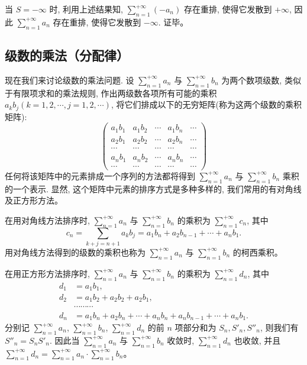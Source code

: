 \documentclass[UTF8,12pt,a4paper,fontset=fandol]{ctexart}
\begin{document}
当 $S=-\infty$ 时, 利用上述结果知, $\sum\limits_{n=1}^{+\infty}(-a_n)$ 存在重排, 使得它发散到 $+\infty$, 因此 $\sum\limits_{n=1}^{+\infty}a_n$ 存在重排, 使得它发散到 $-\infty$. 证毕。

\subsection{级数的乘法（分配律）}

现在我们来讨论级数的乘法问题. 设 $\sum\limits_{n=1}^{+\infty}a_n$ 与 $\sum\limits_{n=1}^{+\infty}b_n$ 为两个数项级数, 类似于有限项求和的乘法规则, 作出两级数各项所有可能的乘积 $a_kb_j(k=1,2,\cdots,j=1,2,\cdots)$, 将它们排成以下的无穷矩阵(称为这两个级数的乘积矩阵):
\[
  \begin{pmatrix}
    a_1b_1 & a_1b_2 & \cdots & a_1b_n & \cdots\\
    a_2b_1 & a_2b_2 & \cdots & a_2b_n & \cdots\\
    \cdots & \cdots & \cdots & \cdots & \cdots\\
    a_nb_1 & a_nb_2 & \cdots & a_nb_n & \cdots\\
    \cdots & \cdots & \cdots & \cdots & \cdots
  \end{pmatrix}
\]
任何将该矩阵中的元素排成一个序列的方法都将得到 $\sum\limits_{n=1}^{+\infty}a_n$ 与 $\sum\limits_{n=1}^{+\infty}b_n$ 乘积的一个表示. 显然, 这个矩阵中元素的排序方式是多种多样的, 我们常用的有对角线及正方形方法。

在用对角线方法排序时, $\sum\limits_{n=1}^{+\infty}a_n$ 与 $\sum\limits_{n=1}^{+\infty}b_n$ 的乘积为 $\sum\limits_{n=1}^{+\infty}c_n$, 其中
\[
  c_n=\sum_{k+j=n+1}a_kb_j=a_1b_n+a_2b_{n-1}+\cdots+a_nb_1.
\]
用对角线方法得到的级数的乘积也称为 $\sum\limits_{n=1}^{+\infty}a_n$ 与 $\sum\limits_{n=1}^{+\infty}b_n$ 的柯西乘积。

在用正方形方法排序时, $\sum\limits_{n=1}^{+\infty}a_n$ 与 $\sum\limits_{n=1}^{+\infty}b_n$ 的乘积为 $\sum\limits_{n=1}^{+\infty}d_n$, 其中
\[
\begin{aligned}
  d_1&=a_1b_1,\\
  d_2&=a_1b_2+a_2b_2+a_2b_1,\\
  &\cdots\cdots\cdots\\
  d_n&=a_1b_n+a_2b_n+\cdots+a_nb_n+a_nb_{n-1}+\cdots+a_nb_1.
\end{aligned}
\]
分别记 $\sum\limits_{n=1}^{+\infty}a_n$, $\sum\limits_{n=1}^{+\infty}b_n$, $\sum\limits_{n=1}^{+\infty}d_n$ 的前 $n$ 项部分和为 $S_n,S'_n,S''_n$, 则我们有 $S''_n=S_nS'_n$. 因此当 $\sum\limits_{n=1}^{+\infty}a_n$ 与 $\sum\limits_{n=1}^{+\infty}b_n$ 收敛时, $\sum\limits_{n=1}^{+\infty}d_n$ 也收敛, 并且 $\sum\limits_{n=1}^{+\infty}d_n=\sum\limits_{n=1}^{+\infty}a_n\cdot\sum\limits_{n=1}^{+\infty}b_n$。
\end{document}
